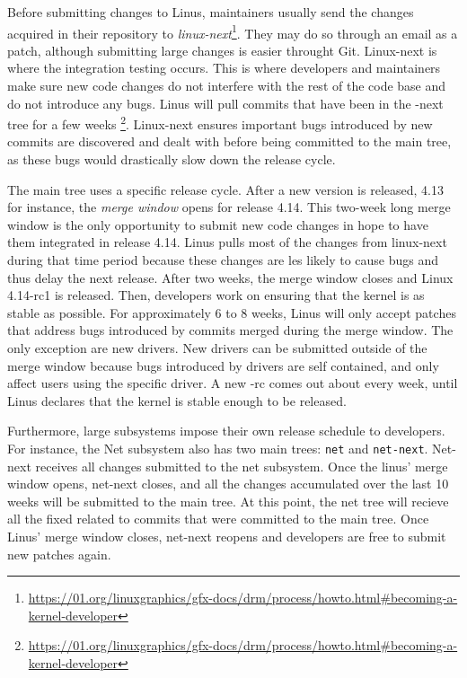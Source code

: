 Before submitting changes to Linus, maintainers usually send the changes acquired in their repository to \textit{linux-next}\footnote{\url{https://01.org/linuxgraphics/gfx-docs/drm/process/howto.html\#becoming-a-kernel-developer}}. They may do so through an email as a patch, although submitting large changes is easier throught Git. Linux-next is where the integration testing occurs. This is where developers and maintainers make sure new code changes do not interfere with the rest of the code base and do not introduce any bugs. Linus will pull commits that have been in the -next tree for a few weeks \footnote{\url{https://01.org/linuxgraphics/gfx-docs/drm/process/howto.html\#becoming-a-kernel-developer}}. Linux-next ensures important bugs introduced by new commits are discovered and dealt with before being committed to the main tree, as these bugs would drastically slow down the release cycle. 


The main tree uses a specific release cycle. After a new version is released, 4.13 for instance, the \textit{merge window} opens for release 4.14. This two-week long merge window is the only opportunity to submit new code changes in hope to have them integrated in release 4.14. Linus pulls most of the changes from linux-next during that time period because these changes are les likely to cause bugs and thus delay the next release. After two weeks, the merge window closes and Linux 4.14-rc1 is released. Then, developers work on ensuring that the kernel is as stable as possible. For approximately 6 to 8 weeks, Linus will only accept patches that address bugs introduced by commits merged during the merge window. The only exception are new drivers. New drivers can be submitted outside of the merge window because bugs introduced by drivers are self contained, and only affect users using the specific driver. A new -rc comes out about every week, until Linus declares that the kernel is stable enough to be released. 

Furthermore, large subsystems impose their own release schedule to developers. For instance, the Net subsystem also has two main trees: \texttt{net} and \texttt{net-next}. Net-next receives all changes submitted to the net subsystem. Once the linus' merge window opens, net-next closes, and all the changes accumulated over the last 10 weeks will be submitted to the main tree. At this point, the net tree will recieve all the fixed related to commits that were committed to the main tree. Once Linus' merge window closes, net-next reopens and developers are free to submit new patches again. 

